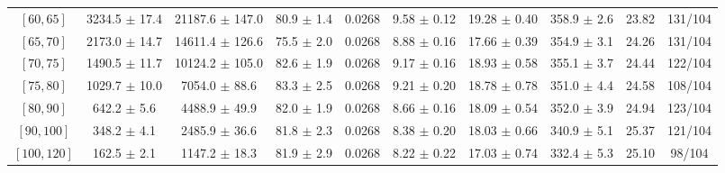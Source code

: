 \begin{tabular}{c||c|c|c|c|c|c|c||c|c}
$[60, 65]$ & 3234.5 $\pm$ 17.4 & 21187.6 $\pm$ 147.0 & 80.9 $\pm$ 1.4 & 0.0268 & 9.58 $\pm$ 0.12 & 19.28 $\pm$ 0.40 & 358.9 $\pm$ 2.6 & 23.82 & 131/104\\
$[65, 70]$ & 2173.0 $\pm$ 14.7 & 14611.4 $\pm$ 126.6 & 75.5 $\pm$ 2.0 & 0.0268 & 8.88 $\pm$ 0.16 & 17.66 $\pm$ 0.39 & 354.9 $\pm$ 3.1 & 24.26 & 131/104\\
$[70, 75]$ & 1490.5 $\pm$ 11.7 & 10124.2 $\pm$ 105.0 & 82.6 $\pm$ 1.9 & 0.0268 & 9.17 $\pm$ 0.16 & 18.93 $\pm$ 0.58 & 355.1 $\pm$ 3.7 & 24.44 & 122/104\\
$[75, 80]$ & 1029.7 $\pm$ 10.0 & 7054.0 $\pm$ 88.6 & 83.3 $\pm$ 2.5 & 0.0268 & 9.21 $\pm$ 0.20 & 18.78 $\pm$ 0.78 & 351.0 $\pm$ 4.4 & 24.58 & 108/104\\
$[80, 90]$ & 642.2 $\pm$ 5.6 & 4488.9 $\pm$ 49.9 & 82.0 $\pm$ 1.9 & 0.0268 & 8.66 $\pm$ 0.16 & 18.09 $\pm$ 0.54 & 352.0 $\pm$ 3.9 & 24.94 & 123/104\\
$[90, 100]$ & 348.2 $\pm$ 4.1 & 2485.9 $\pm$ 36.6 & 81.8 $\pm$ 2.3 & 0.0268 & 8.38 $\pm$ 0.20 & 18.03 $\pm$ 0.66 & 340.9 $\pm$ 5.1 & 25.37 & 121/104\\
$[100, 120]$ & 162.5 $\pm$ 2.1 & 1147.2 $\pm$ 18.3 & 81.9 $\pm$ 2.9 & 0.0268 & 8.22 $\pm$ 0.22 & 17.03 $\pm$ 0.74 & 332.4 $\pm$ 5.3 & 25.10 & 98/104\\
\end{tabular}

